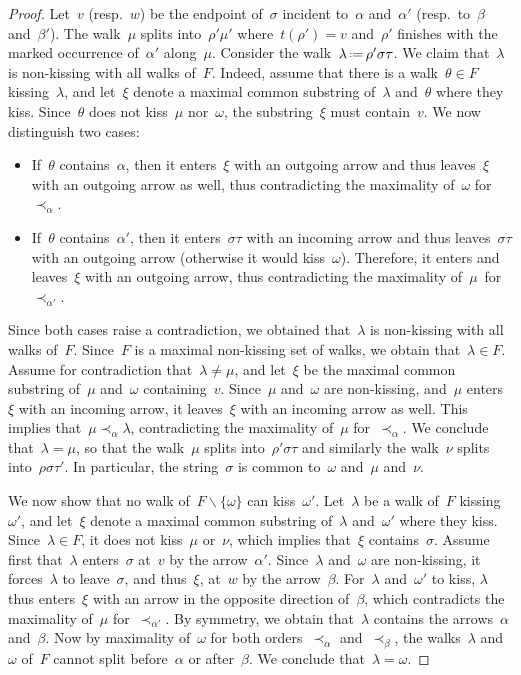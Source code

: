\documentclass{amsart}
\theoremstyle{definition}
\newcommand{\ssm}{\smallsetminus} %
\newcommand{\eqdef}{\mbox{\,\raisebox{0.2ex}{\scriptsize\ensuremath{\mathrm:}}\ensuremath{=}\,}} %
\begin{document}
\begin{proof}
Let~$v$ (resp.~$w$) be the endpoint of~$\sigma$ incident to~$\alpha$ and~$\alpha'$ (resp.~to~$\beta$ and~$\beta'$).
The walk~$\mu$ splits into~$\rho' \mu'$ where~$t(\rho') = v$ and~$\rho'$ finishes with the marked occurrence of~$\alpha'$ along~$\mu$.
Consider the walk~$\lambda \eqdef \rho' \sigma \tau$.
We claim that~$\lambda$ is non-kissing with all walks of~$F$.
Indeed, assume that there is a walk~$\theta \in F$ kissing~$\lambda$, and let~$\xi$ denote a maximal common substring of~$\lambda$ and~$\theta$ where they kiss.
Since~$\theta$ does not kiss~$\mu$ nor~$\omega$, the substring~$\xi$ must contain~$v$.
We now distinguish two cases:
\begin{itemize}
\item If~$\theta$ contains~$\alpha$, then it enters~$\xi$ with an outgoing arrow and thus leaves~$\xi$ with an outgoing arrow as well, thus contradicting the maximality of~$\omega$ for~$\prec_\alpha$.
\item If~$\theta$ contains~$\alpha'$, then it enters~$\sigma\tau$ with an incoming arrow and thus leaves~$\sigma\tau$ with an outgoing arrow (otherwise it would kiss~$\omega$). Therefore, it enters and leaves~$\xi$ with an outgoing arrow, thus contradicting the maximality of~$\mu$~for~$\prec_{\alpha'}$.
\end{itemize}
Since both cases raise a contradiction, we obtained that~$\lambda$ is non-kissing with all walks of~$F$.
Since~$F$ is a maximal non-kissing set of walks, we obtain that~$\lambda \in F$.
Assume for contradiction that~$\lambda \ne \mu$, and let~$\xi$ be the maximal common substring of~$\mu$ and~$\omega$ containing~$v$.
Since~$\mu$ and~$\omega$ are non-kissing, and~$\mu$ enters~$\xi$ with an incoming arrow, it leaves~$\xi$ with an incoming arrow as well.
This implies that~$\mu \prec_\alpha \lambda$, contradicting the maximality of~$\mu$ for~$\prec_\alpha$.
We conclude that~$\lambda = \mu$, so that the walk~$\mu$ splits into~$\rho' \sigma \tau$ and similarly the walk~$\nu$ splits into~${\rho \sigma \tau'}$.
In particular, the string~$\sigma$ is common to~$\omega$ and~$\mu$ and~$\nu$.

We now show that no walk of~$F \ssm \{\omega\}$ can kiss~$\omega'$.
Let~$\lambda$ be a walk of~$F$ kissing~$\omega'$, and let~$\xi$ denote a maximal common substring of~$\lambda$ and~$\omega'$ where they kiss.
Since~$\lambda \in F$, it does not kiss~$\mu$ or~$\nu$, which implies that~$\xi$ contains~$\sigma$.
Assume first that~$\lambda$ enters~$\sigma$ at~$v$ by the arrow~$\alpha'$.
Since~$\lambda$ and~$\omega$ are non-kissing, it forces~$\lambda$ to leave~$\sigma$, and thus~$\xi$, at~$w$ by the arrow~$\beta$.
For~$\lambda$ and~$\omega'$ to kiss, $\lambda$ thus enters~$\xi$ with an arrow in the opposite direction of~$\beta$, which contradicts the maximality of~$\mu$ for~$\prec_{\alpha'}$.
By symmetry, we obtain that~$\lambda$ contains the arrows~$\alpha$ and~$\beta$.
Now by maximality of~$\omega$ for both orders~$\prec_\alpha$ and~$\prec_\beta$, the walks~$\lambda$ and~$\omega$ of~$F$ cannot split before~$\alpha$ or after~$\beta$.
We conclude that~$\lambda = \omega$.


\end{proof}
\end{document}
